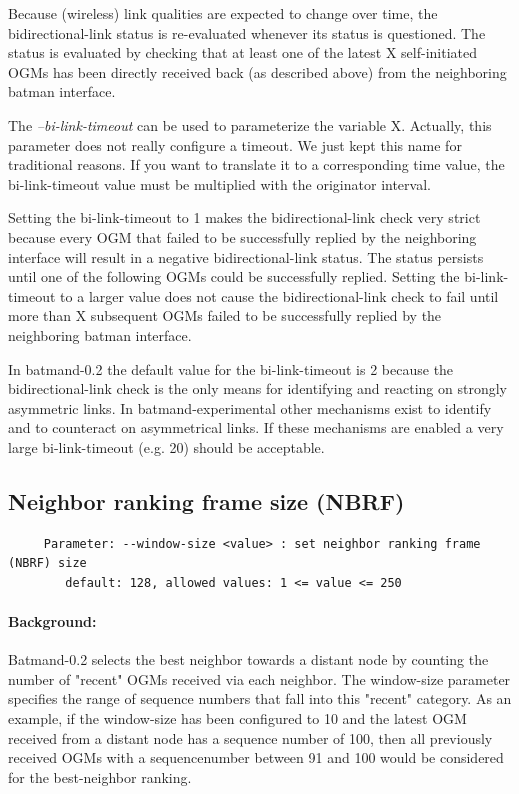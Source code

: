 \documentclass[11pt]{article}
\begin{document}
Because (wireless) link qualities are expected to change over time, the bidirectional-link status is re-evaluated whenever its status is questioned.
%
The status is evaluated by checking that at least one of the latest X self-initiated OGMs has been directly received back (as described above) from the neighboring batman interface.

The  \emph{--bi-link-timeout} can be used to parameterize the variable X.
%
Actually, this parameter does not really configure a timeout. We just kept this name for traditional reasons. If you want to translate it to a corresponding time value, the bi-link-timeout value must be multiplied with the originator interval.

Setting the bi-link-timeout to 1 makes the bidirectional-link check very strict because every OGM that failed to be successfully replied by the neighboring interface will result in a negative bidirectional-link status. The status persists until one of the following OGMs could be successfully replied.
%
Setting the bi-link-timeout to a larger value does not cause the bidirectional-link check to fail until more than X subsequent OGMs failed to be successfully replied by the neighboring batman interface.

In batmand-0.2 the default value for the bi-link-timeout is 2 because the bidirectional-link check is the only means for identifying and reacting on strongly asymmetric links.
%
In batmand-experimental other mechanisms exist to identify and to counteract on asymmetrical links. If these mechanisms are enabled a very large bi-link-timeout (e.g. 20) should be acceptable.



\subsection{Neighbor ranking frame size (NBRF)}

\begin{small}
\begin{verbatim}
     Parameter: --window-size <value> : set neighbor ranking frame (NBRF) size
        default: 128, allowed values: 1 <= value <= 250
\end{verbatim}
\end{small}

\paragraph{Background:} Batmand-0.2 selects the best neighbor towards a distant node by counting the number of "recent" OGMs received via each neighbor. The window-size parameter specifies the range of sequence numbers that fall into this "recent" category. As an example, if the window-size has been configured to 10 and the latest OGM received from a distant node has a sequence number of 100, then all previously received OGMs with a sequencenumber between 91 and 100 would be considered for the best-neighbor ranking.
\end{document}
